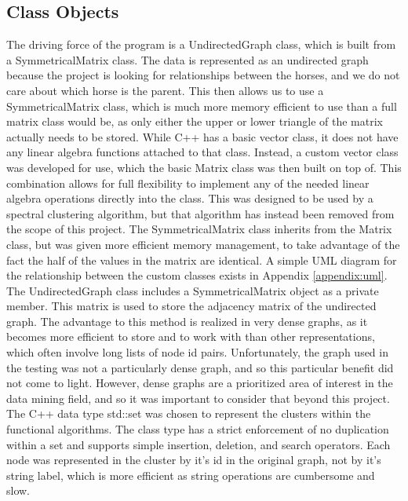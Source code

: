 \documentclass[12pt]{article}
\begin{document}
\subsection{Class Objects}
The driving force of the program is a UndirectedGraph class, which is built from a SymmetricalMatrix class. The data is represented as an undirected graph because the project is looking for relationships between the horses, and we do not care about which horse is the parent. This then allows us to use a SymmetricalMatrix class, which is much more memory efficient to use than a full matrix class would be, as only either the upper or lower triangle of the matrix actually needs to be stored.
\newline\newline
While C++ has a basic vector class, it does not have any linear algebra functions attached to that class. Instead, a custom vector class was developed for use, which the basic Matrix class was then built on top of. This combination allows for full flexibility to implement any of the needed linear algebra operations directly into the class. This was designed to be used by a spectral clustering algorithm, but that algorithm has instead been removed from the scope of this project. The SymmetricalMatrix class inherits from the Matrix class, but was given more efficient memory management, to take advantage of the fact the half of the values in the matrix are identical. A simple UML diagram for the relationship between the custom classes exists in Appendix \ref{appendix:uml}.
\newline\newline
The UndirectedGraph class includes a SymmetricalMatrix object as a private member. This matrix is used to store the adjacency matrix of the undirected graph. The advantage to this method is realized in very dense graphs, as it becomes more efficient to store and to work with than other representations, which often involve long lists of node id pairs. Unfortunately, the graph used in the testing was not a particularly dense graph, and so this particular benefit did not come to light. However, dense graphs are a prioritized area of interest in the data mining field, and so it was important to consider that beyond this project.
\newline\newline
The C++ data type std::set was chosen to represent the clusters within the functional algorithms. The class type has a strict enforcement of no duplication within a set and supports simple insertion, deletion, and search operators. Each node was represented in the cluster by it's id in the original graph, not by it's string label, which is more efficient as string operations are cumbersome and slow.
\end{document}
